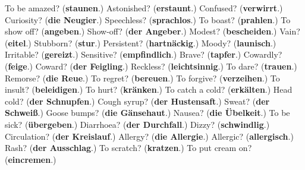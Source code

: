 \begin{tcolorbox}[breakable,colback=teal!4,colframe=teal!35!black,title={Before you move on}]
To be amazed? (\textbf{staunen}.) Astonished? (\textbf{erstaunt}.) Confused? (\textbf{verwirrt}.) Curiosity? (\textbf{die Neugier}.) Speechless? (\textbf{sprachlos}.) To boast? (\textbf{prahlen}.) To show off? (\textbf{angeben}.) Show-off? (\textbf{der Angeber}.) Modest? (\textbf{bescheiden}.) Vain? (\textbf{eitel}.) Stubborn? (\textbf{stur}.) Persistent? (\textbf{hartnäckig}.) Moody? (\textbf{launisch}.) Irritable? (\textbf{gereizt}.) Sensitive? (\textbf{empfindlich}.) Brave? (\textbf{tapfer}.) Cowardly? (\textbf{feige}.) Coward? (\textbf{der Feigling}.) Reckless? (\textbf{leichtsinnig}.) To dare? (\textbf{trauen}.) Remorse? (\textbf{die Reue}.) To regret? (\textbf{bereuen}.) To forgive? (\textbf{verzeihen}.) To insult? (\textbf{beleidigen}.) To hurt? (\textbf{kränken}.) To catch a cold? (\textbf{erkälten}.) Head cold? (\textbf{der Schnupfen}.) Cough syrup? (\textbf{der Hustensaft}.) Sweat? (\textbf{der Schweiß}.) Goose bumps? (\textbf{die Gänsehaut}.) Nausea? (\textbf{die Übelkeit}.) To be sick? (\textbf{übergeben}.) Diarrhoea? (\textbf{der Durchfall}.) Dizzy? (\textbf{schwindlig}.) Circulation? (\textbf{der Kreislauf}.) Allergy? (\textbf{die Allergie}.) Allergic? (\textbf{allergisch}.) Rash? (\textbf{der Ausschlag}.) To scratch? (\textbf{kratzen}.) To put cream on? (\textbf{eincremen}.)
\end{tcolorbox}
